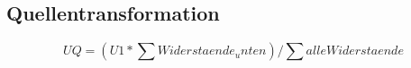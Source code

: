 \subsection{Quellentransformation}
$$UQ = (U1 * \sum{Widerstaende_unten}) / \sum{alle Widerstaende}$$
